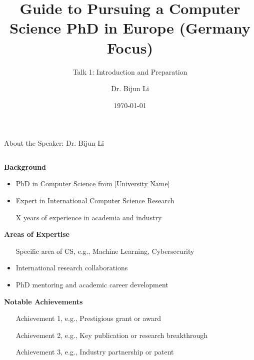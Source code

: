 \documentclass[aspectratio=169,10pt]{beamer}
\title{Guide to Pursuing a Computer Science PhD in Europe (Germany Focus)}
\subtitle{Talk 1: Introduction and Preparation}
\date{\today}
\author{Dr. Bijun Li}
\institute{Expert in International Computer Science Research}
\begin{document}
\maketitle

\begin{frame}{About the Speaker: Dr. Bijun Li}
    \begin{columns}[T]
        \begin{column}{0.7\textwidth}
            \textbf{Background}
            \begin{itemize}
                \item PhD in Computer Science from [University Name]
                \item Expert in International Computer Science Research
                \item [X] years of experience in academia and industry
            \end{itemize}
            
            \textbf{Areas of Expertise}
            \begin{itemize}
                \item [Specific area of CS, e.g., Machine Learning, Cybersecurity]
                \item International research collaborations
                \item PhD mentoring and academic career development
            \end{itemize}
            
            \textbf{Notable Achievements}
            \begin{itemize}
                \item [Achievement 1, e.g., Prestigious grant or award]
                \item [Achievement 2, e.g., Key publication or research breakthrough]
                \item [Achievement 3, e.g., Industry partnership or patent]
            \end{itemize}
        \end{column}
    \end{columns}
\end{frame}
\end{document}
